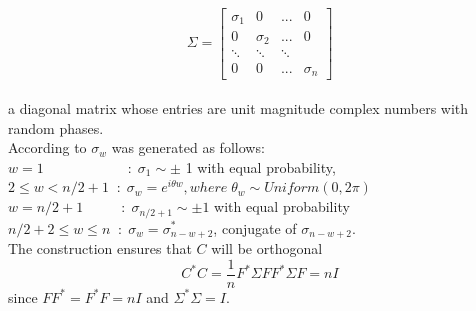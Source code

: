 	
	$$
	\Sigma = \begin{bmatrix}
	\sigma_{1} & 0 & ...& 0           \\[0.3em]
	0 & \sigma_{2} & ... & 0 \\[0.3em]
	\ddots &\ddots & \ddots &      \\[0.3em]
	0 & 0 & ... & \sigma_{n}        
	\end{bmatrix} $$
	\\
	a diagonal matrix whose entries are unit magnitude complex numbers with random phases.
\\
	According to \cite{romberg2009} $\sigma_{w}$ was generated as follows:
    \\[1em]
	
	$w=1\qquad \qquad \qquad : \; \sigma_{1} \sim \pm$ 1 with equal probability,
	\\[1em]
	$2 \le w < n/2+1 \; \; : \; \sigma_{w}=e^{i\theta w}, where \; {\theta}_{w} \sim Uniform(0,2\pi) $
	\\[1em]
	$w=n/2+1 \qquad \; \; \, : \; \sigma_{n/2+1} \sim \pm 1 $ with equal probability 
	\\[1em]
	$n/2+2 \le w \le n \; \; : \; \sigma_{w}=\sigma^{*}_{n-w+2}$, conjugate of  $\sigma_{n-w+2}$.
	\\[1em]
    
	The construction ensures that $C$ will be orthogonal
	$$ C^*C=\dfrac{{1}}{n} F^* \Sigma F F^* \Sigma F = nI $$
	since $FF^*=F^*F=nI$ and $\Sigma^* \Sigma = I$.
	
